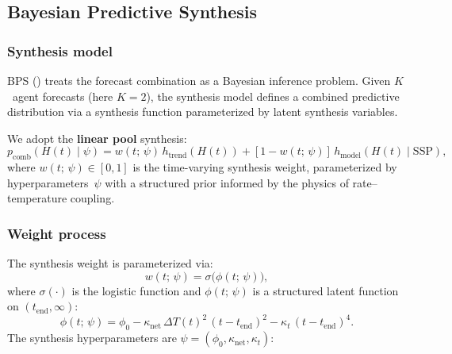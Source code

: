 \documentclass[11pt]{article}
\newcommand{\dT}{\Delta T}
\newcommand{\tend}{t_{\mathrm{end}}}
\begin{document}
\subsection{Bayesian Predictive Synthesis}
\label{sec:bps}

\subsubsection{Synthesis model}

BPS (\citealt{McAlinn2019}) treats the forecast combination as a Bayesian inference problem.  Given $K$~agent forecasts (here $K = 2$), the synthesis model defines a combined predictive distribution via a synthesis function parameterized by latent synthesis variables.

We adopt the \textbf{linear pool} synthesis:
\begin{equation}
  p_{\mathrm{comb}}(H(t) \mid \psi) = w(t;\,\psi)\,h_{\mathrm{trend}}(H(t)) + [1 - w(t;\,\psi)]\,h_{\mathrm{model}}(H(t) \mid \mathrm{SSP}),
  \label{eq:bps_synthesis}
\end{equation}
where $w(t;\,\psi) \in [0, 1]$ is the time-varying synthesis weight, parameterized by hyperparameters~$\psi$ with a structured prior informed by the physics of rate--temperature coupling.

\subsubsection{Weight process}
\label{sec:weight_process}

The synthesis weight is parameterized via:
\begin{equation}
  w(t;\,\psi) = \sigma\!\big(\phi(t;\,\psi)\big),
  \label{eq:weight_logistic}
\end{equation}
where $\sigma(\cdot)$ is the logistic function and $\phi(t;\,\psi)$ is a structured latent function on $(t_{\mathrm{end}}, \infty)$:
\begin{equation}
  \phi(t;\,\psi) = \phi_0 - \kappa_{\mathrm{net}}\,\dT(t)^2\,(t - \tend)^2 - \kappa_t\,(t - \tend)^4.
  \label{eq:phi_process}
\end{equation}
The synthesis hyperparameters are $\psi = (\phi_0, \kappa_{\mathrm{net}}, \kappa_t)$:
\end{document}
